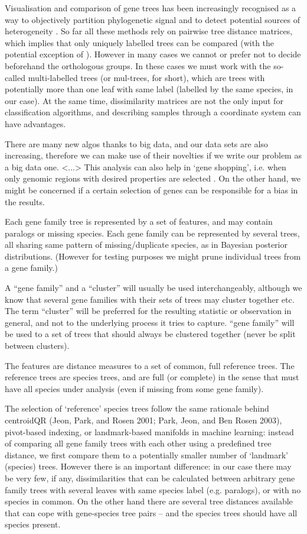 Visualisation and comparison of gene trees has been increasingly recognised as a way to objectively partition
phylogenetic signal and to detect potential sources of heterogeneity \citep{Gori2016,Jombart2017, Huang2016}.
So far all these methods rely on pairwise tree distance matrices, which implies that only uniquely labelled
trees can be compared (with the potential exception of \cite{Kendall2018}). 
However in many cases we cannot or prefer not to decide beforehand the orthologous groups. 
In these cases we must work with  the so-called
multi-labelled trees (or mul-trees, for short), which are trees with potentially more than one leaf with same label
(labelled by the same species, in our case). At the same time, dissimilarity matrices are not the only input for
classification algorithms, and describing samples through a coordinate system can have advantages.

There are many new algos thanks to big data, and our data sets are also increasing, therefore we can make use of their
novelties if we write our problem as a big data one. <...> This analysis can also help in ‘gene shopping’, i.e. when
only genomic regions with desired properties are selected \citep{Smith2018}.
On the other hand, we might be concerned if a certain selection of genes can be responsible for a bias in the results.

Each gene family tree is represented by a set of features, and may contain paralogs or missing species. Each gene family
can be represented by several trees, all sharing same pattern of missing/duplicate species, as in Bayesian posterior
distributions. (However for testing purposes we might prune individual trees from a gene family.)

A “gene family” and a “cluster” will usually be used interchangeably, although we know that several gene families with
their sets of trees may cluster together etc. The term “cluster” will be preferred for the resulting statistic or
observation in general, and not to the underlying process it tries to capture. “gene family” will be used to a set of
trees that should always be clustered together (never be split between clusters).

The features are distance measures to a set of common, full reference trees. The reference trees are species trees, and
are full (or complete) in the sense that must have all species under analysis (even if missing from some gene family).

The selection of ‘reference’ species trees follow the same rationale behind centroidQR (Jeon, Park, and Rosen 2001;
Park, Jeon, and Ben Rosen 2003), pivot-based indexing, or landmark-based manifolds in machine learning: instead of
comparing all gene family trees with each other using a predefined tree distance, we first compare them to a potentially
smaller number of ‘landmark’ (species) trees. However there is an important difference: in our case there may be very
few, if any, dissimilarities that can be calculated between arbitrary gene family trees with several leaves with same
species label (e.g. paralogs), or with no species in common. On the other hand there are several tree distances
available that can cope with gene-species tree pairs – and the species trees should have all species present.


